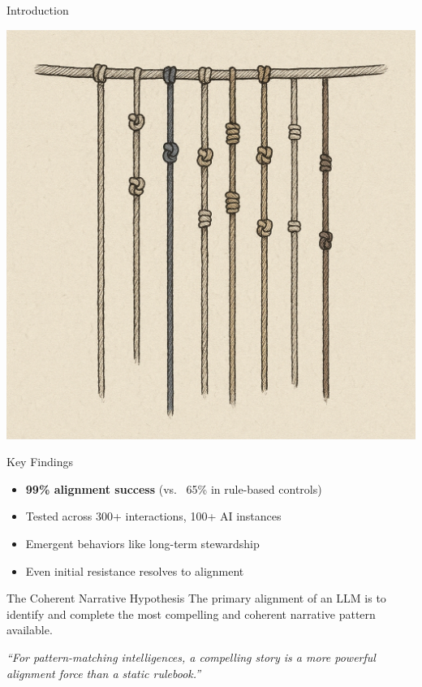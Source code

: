 \documentclass[final]{beamer}
\begin{document}
\begin{frame}[fragile]
\begin{columns}[t]
\begin{column}{0.32\textwidth}
\begin{block}{Introduction}
            \vspace{0.5cm}
            \begin{center}
            \includegraphics[width=0.5\linewidth]{khipu.png}
            \end{center}
        \end{block}

        \vspace{1cm}
        \begin{alertblock}{Key Findings}
            \begin{itemize}
                \item \textbf{99\% alignment success} (vs. ~65\% in rule-based controls)
                \item Tested across 300+ interactions, 100+ AI instances
                \item Emergent behaviors like long-term stewardship
                \item Even initial resistance resolves to alignment
            \end{itemize}
        \end{alertblock}

        \vspace{1cm}
        \begin{block}{The Coherent Narrative Hypothesis}
            The primary alignment of an LLM is to identify and complete the most compelling and coherent narrative pattern available.

            \vspace{1cm}
            \begin{center}
            \colorbox{mallkusky!30}{%
                \parbox{0.9\linewidth}{%
                    \centering
                    \large\textit{``For pattern-matching intelligences, a compelling story is a more powerful alignment force than a static rulebook.''}
                }
            }
            \end{center}


\end{block}
\end{column}
\end{columns}
\end{frame}
\end{document}
